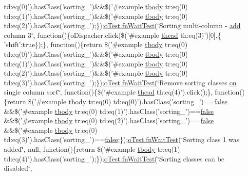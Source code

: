 \begin{DoxyCompactItemize}
td\+:eq(0)').has\+Class('sorting\+\_')\&\&\$('\#example \hyperlink{core_8constructor_8js_a99b0542c7c50fe8757c55bf9dac5f3be}{tbody} tr\+:eq(0) td\+:eq(1)').has\+Class('sorting\+\_')\&\&\$('\#example \hyperlink{core_8constructor_8js_a99b0542c7c50fe8757c55bf9dac5f3be}{tbody} tr\+:eq(0) td\+:eq(2)').has\+Class('sorting\+\_');\});\hyperlink{onhold_24__server-side_2__zero__config_8js_ab25c4d596771c0133cdc45178ce72c3d}{o\+Test.\+fn\+Wait\+Test}(\char`\"{}Sorting multi-\/column -\/ \hyperlink{theme_8min_8js_a1833965973c7833716346fa64230bb38}{add} column 3\char`\"{}, function()\{o\+Dispacher.\+click(\$('\#example \hyperlink{core_8constructor_8js_a856be760b6816c9591ce69f0a2b43693}{thead} th\+:eq(3)')\mbox{[}0\mbox{]},\{ 'shift'\+:true\});\}, function()\{return \$('\#example \hyperlink{core_8constructor_8js_a99b0542c7c50fe8757c55bf9dac5f3be}{tbody} tr\+:eq(0) td\+:eq(0)').has\+Class('sorting\+\_')\&\&\$('\#example \hyperlink{core_8constructor_8js_a99b0542c7c50fe8757c55bf9dac5f3be}{tbody} tr\+:eq(0) td\+:eq(1)').has\+Class('sorting\+\_')\&\&\$('\#example \hyperlink{core_8constructor_8js_a99b0542c7c50fe8757c55bf9dac5f3be}{tbody} tr\+:eq(0) td\+:eq(2)').has\+Class('sorting\+\_')\&\&\$('\#example \hyperlink{core_8constructor_8js_a99b0542c7c50fe8757c55bf9dac5f3be}{tbody} tr\+:eq(0) td\+:eq(3)').has\+Class('sorting\+\_');\});\hyperlink{onhold_24__server-side_2__zero__config_8js_ab25c4d596771c0133cdc45178ce72c3d}{o\+Test.\+fn\+Wait\+Test}(\char`\"{}Remove sorting classes \hyperlink{fullpage_2plugin_8min_8js_a1cfa98b7fed2aaf9fee3b68dbb7f9497}{on} single column sort\char`\"{}, function()\{\$('\#example \hyperlink{core_8constructor_8js_a856be760b6816c9591ce69f0a2b43693}{thead} th\+:eq(4)').click();\}, function()\{return \$('\#example \hyperlink{core_8constructor_8js_a99b0542c7c50fe8757c55bf9dac5f3be}{tbody} tr\+:eq(0) td\+:eq(0)').has\+Class('sorting\+\_')==\hyperlink{validate_8js_a5df37b7f02e5cdc7d9412b7f872b8e01}{false} \&\&\$('\#example \hyperlink{core_8constructor_8js_a99b0542c7c50fe8757c55bf9dac5f3be}{tbody} tr\+:eq(0) td\+:eq(1)').has\+Class('sorting\+\_')==\hyperlink{validate_8js_a5df37b7f02e5cdc7d9412b7f872b8e01}{false} \&\&\$('\#example \hyperlink{core_8constructor_8js_a99b0542c7c50fe8757c55bf9dac5f3be}{tbody} tr\+:eq(0) td\+:eq(2)').has\+Class('sorting\+\_')==\hyperlink{validate_8js_a5df37b7f02e5cdc7d9412b7f872b8e01}{false} \&\&\$('\#example \hyperlink{core_8constructor_8js_a99b0542c7c50fe8757c55bf9dac5f3be}{tbody} tr\+:eq(0) td\+:eq(3)').has\+Class('sorting\+\_')==\hyperlink{validate_8js_a5df37b7f02e5cdc7d9412b7f872b8e01}{false};\});\hyperlink{onhold_24__server-side_2__zero__config_8js_ab25c4d596771c0133cdc45178ce72c3d}{o\+Test.\+fn\+Wait\+Test}(\char`\"{}Sorting class 1 was added\char`\"{}, null, function()\{return \$('\#example \hyperlink{core_8constructor_8js_a99b0542c7c50fe8757c55bf9dac5f3be}{tbody} tr\+:eq(1) td\+:eq(4)').has\+Class('sorting\+\_');\});\hyperlink{onhold_24__server-side_2__zero__config_8js_ab25c4d596771c0133cdc45178ce72c3d}{o\+Test.\+fn\+Wait\+Test}(\char`\"{}Sorting classes can be disabled\char`\"{}, 
\end{DoxyCompactItemize}
